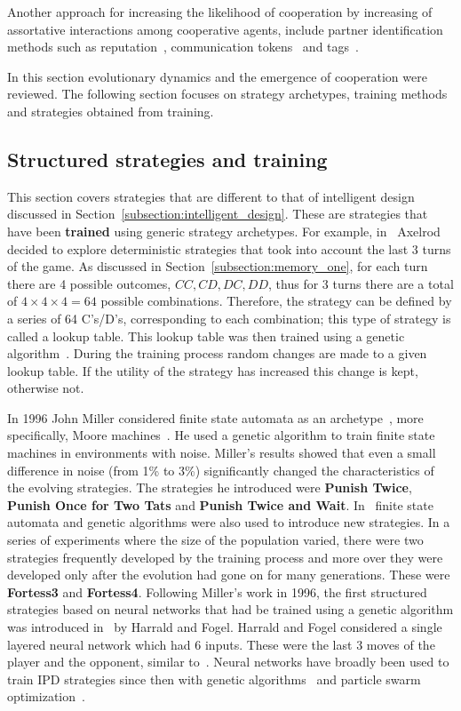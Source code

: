 \documentclass{article}
\theoremstyle{definition}
\begin{document}
Another approach for increasing the likelihood of cooperation by increasing of
assortative interactions among cooperative agents, include partner identification
methods such as reputation~\cite{Janssen2006, Nowak1998, Suzuki2005},
communication tokens~\cite{Miller2002} and tags~\cite{Choi2006, Hales2000,
Miller2002, Riolo2001}.

In this section evolutionary dynamics and the emergence of cooperation were
reviewed. The following section focuses on strategy archetypes, training methods
and strategies obtained from training.

\subsection{Structured strategies and training}
\label{section:structured_strategies}

This section covers strategies that are different to that of intelligent design discussed
in Section~\ref{subsection:intelligent_design}. These are strategies that have
been \textbf{trained} using generic strategy archetypes. For example,
in~\cite{Axelrod1987} Axelrod decided to explore deterministic strategies that
took into account the last 3 turns of the game. As discussed in
Section~\ref{subsection:memory_one}, for each turn there are 4 possible outcomes,
\(CC, CD, DC, DD\), thus for 3 turns there are a total of
\(4\times4\times4=64\) possible combinations. Therefore, the strategy can be
defined by a series of 64 C's/D's, corresponding to each combination; this type
of strategy is called a lookup table.
This lookup table was then trained using a
genetic algorithm~\cite{Koza1997}. During the training process random changes are made to a
given lookup table. If the utility of the strategy has increased this
change is kept, otherwise not.

In 1996 John Miller considered finite state automata as an
archetype~\cite{Miller1996}, more specifically, Moore
machines~\cite{moore1956}. He used a genetic algorithm to train finite state
machines in environments with noise. Miller's results showed that even a small
difference in noise (from 1\% to 3\%) significantly changed the characteristics
of the evolving strategies. The strategies he introduced were \textbf{Punish
Twice}, \textbf{Punish Once for Two Tats} and \textbf{Punish Twice and Wait}.
In~\cite{Ashlock2006b} finite state automata and genetic algorithms were also
used to introduce new strategies. In a series of experiments where the size of
the population varied, there were two strategies frequently developed by the
training process and more over they were developed only after the evolution had
gone on for many generations. These were \textbf{Fortess3} and
\textbf{Fortess4}.
Following Miller's work in 1996, the first structured strategies based on neural
networks that had be trained using a genetic algorithm was introduced
in~\cite{Harrald1996} by Harrald and Fogel. Harrald and Fogel considered a
single layered neural network which had 6 inputs. These were the last 3 moves of
the player and the opponent, similar to~\cite{Axelrod1987}. Neural networks have
broadly been used to train IPD strategies since then with genetic
algorithms~\cite{Ashlock2006a, Chong2005, Marks1999} and particle swarm
optimization~\cite{Franken2005}.
\end{document}
